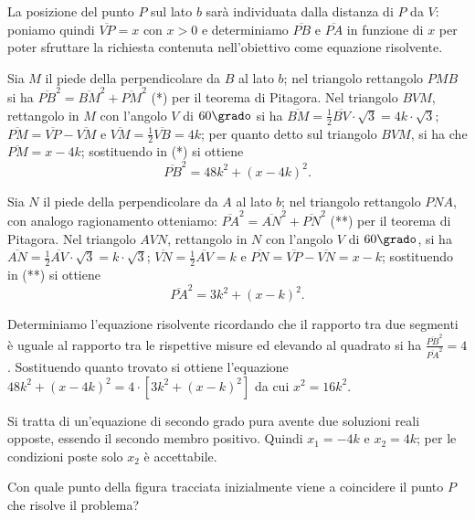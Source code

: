 \begin{soluzione}
La posizione del punto $ P $ sul lato $ b $ sarà individuata dalla distanza di $ P $ da $ V $: poniamo quindi $\overline {VP} = x$ con $x > 0$ e determiniamo
$\overline {PB}$ e $\overline {PA}$ in funzione di $ x $ per poter sfruttare la richiesta contenuta nell'obiettivo come equazione risolvente.

Sia $ M $ il piede della perpendicolare da $ B $ al lato $ b $; nel triangolo rettangolo $ PMB $ si ha $\overline {PB}^{2} = \overline {BM}^{2} + \overline {PM}^{2}$ (*) per il teorema di Pitagora. Nel triangolo $ BVM $, rettangolo in $ M $ con l'angolo $ V $ di $ 60\grado $ si ha $\overline {BM} = \frac{1}{2} \overline {BV} \cdot \sqrt{3} = 4 k\cdot \sqrt{3}$; $\overline {PM} = \overline {VP} - \overline {VM}$ e $\overline {VM} = \frac{1}{2} \overline {VB} = 4 k$; per quanto detto sul triangolo $ BVM $, si ha che $\overline {PM} = x - 4 k$; sostituendo in (*) si ottiene \[\overline {PB}^{2} = 48 k^{2} + ( x - 4 k )^{2}.\]

Sia $ N $ il piede della perpendicolare da $ A $ al lato $ b $; nel triangolo rettangolo $ PNA $, con analogo ragionamento otteniamo: $\overline {PA}^{2} = \overline {AN}^{2} + \overline {PN}^{2}$ (**) per il teorema di Pitagora. Nel triangolo $ AVN $, rettangolo in $ N $ con l'angolo $ V $ di $ 60\grado $, si ha
$\overline {AN} = \frac{1}{2} \overline {AV} \cdot \sqrt{3} = k \cdot \sqrt{3}$; $ \overline {VN} = \frac{1}{2} \overline {AV} = k$ e $\overline {PN} = \overline {VP} - \overline {VN} = x - k$; sostituendo in (**) si ottiene \[\overline {PA}^{2} = 3 k^{2} + ( x - k )^{2}.\]
\pagebreak

Determiniamo l'equazione risolvente ricordando che il rapporto tra due segmenti è uguale al rapporto tra le rispettive misure ed elevando al quadrato
si ha $\frac{\overline {PB}^{2}}{\overline {PA}^{2}} = 4$. Sostituendo quanto trovato si ottiene l'equazione $48 k^{2} + ( x - 4 k )^{2} = 4 \cdot \left[ 3 k^{2} + ( x - k )^{2} \right]$ da cui $x^{2} = 16 k^{2}$.

Si tratta di un'equazione di secondo grado pura avente due soluzioni reali opposte, essendo il secondo membro positivo. Quindi $x_{1} = -4 k$ e $x_2=4 k$; per le condizioni poste solo $ x_2 $ è accettabile.

Con quale punto della figura tracciata inizialmente viene a coincidere il punto $ P $ che risolve il problema?
\end{soluzione}

\vspazio\ovalbox{\risolvii \ref{ese:3.170}, \ref{ese:3.171}, \ref{ese:3.172}, \ref{ese:3.173}, \ref{ese:3.174}, \ref{ese:3.175}, \ref{ese:3.176}, \ref{ese:3.177}, \ref{ese:3.178}}

\newpage

\cleardoublepage
